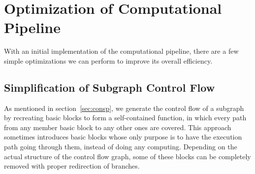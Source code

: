 \section{Optimization of Computational Pipeline}
With an initial implementation of the computational pipeline, there are a few simple optimizations we can perform to improve its overall efficiency. 

\subsection{Simplification of Subgraph Control Flow}
\label{sscf}
As mentioned in section~\ref{sec:consp}, we generate the control flow of a subgraph by
recreating basic blocks to form a self-contained function, in which every path from
any member basic block to any other ones are covered. This approach sometimes introduces 
basic blocks whose only purpose is to have the execution path going through them, instead
of doing any computing. Depending on the actual structure of the control flow graph, some
of these blocks can be completely removed with proper redirection of branches. 

